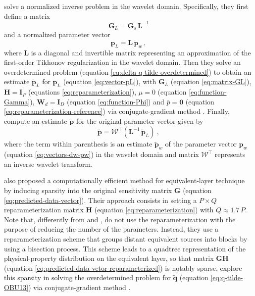 \citet{li-oldenburg2010} solve a normalized inverse problem in the wavelet domain.
Specifically, they first define a matrix
\begin{equation}
	\mathbf{G}_{L} = \mathbf{G}_{s} \, \mathbf{L}^{-1}
	\label{eq:matrix-GL}
\end{equation}
and a normalized parameter vector 
\begin{equation}
	\mathbf{p}_{L} = \mathbf{L} \, \mathbf{p}_{w} \: ,
	\label{eq:vector-pL}
\end{equation}
where $\mathbf{L}$ is a diagonal and invertible matrix representing an approximation of the 
first-order Tikhonov regularization in the wavelet domain.
Then they solve an overdetermined problem (equation \ref{eq:delta-q-tilde-overdetermined}) 
to obtain an estimate $\tilde{\mathbf{p}}_{L}$ for $\mathbf{p}_{L}$ (equation \ref{eq:vector-pL}), 
with $\mathbf{G}_{L}$ (equation \ref{eq:matrix-GL}), 
$\mathbf{H} = \mathbf{I}_{P}$ (equations \ref{eq:reparameterization}),
$\mu = 0$ (equation \ref{eq:function-Gamma}), 
$\mathbf{W}_{d} = \mathbf{I}_{D}$ (equation \ref{eq:function-Phi}) and 
$\bar{p} = \mathbf{0}$ (equation \ref{eq:reparameterization-reference}) via 
conjugate-gradient method \cite[e.g.,][sec. 11.3]{golub-vanloan2013}.
Finally, \citet{li-oldenburg2010} compute an estimate $\tilde{\mathbf{p}}$ for the original parameter vector given by
\begin{equation}
	\tilde{\mathbf{p}} = \boldsymbol{\mathcal{W}}^{\top} \left( \mathbf{L}^{-1} \, \tilde{\mathbf{p}}_{L} \right) \: ,
	\label{eq:vector-p-tilde-LO10}
\end{equation}
where the term within parenthesis is an estimate $\tilde{\mathbf{p}}_{w}$ of the parameter vector $\mathbf{p}_{w}$
(equation \ref{eq:vectors-dw-pw}) in the wavelet domain and 
matrix $\boldsymbol{\mathcal{W}}^{\top}$ represents an inverse wavelet transform. 

\citet{barnes-lumley2011} also proposed a computationally efficient method for equivalent-layer technique 
by inducing sparsity into the original sensitivity matrix $\mathbf{G}$ (equation \ref{eq:predicted-data-vector}). 
Their approach consists in setting a $P \times Q$ reparameterization matrix $\mathbf{H}$
(equation \ref{eq:reparameterization}) with $Q \approx 1.7 \, P$.
Note that, differently from \citet{oliveirajr-etal2013} and \citet{mendonca-2020}, \citet{barnes-lumley2011}
do not use the reparameterization with the purpose of reducing the number of the parameters.
Instead, they use a reparameterization scheme that groups distant equivalent sources into blocks by
using a bisection process. 
This scheme leads to a quadtree representation of the physical-property distribution on the equivalent layer, 
so that matrix $\mathbf{G}\mathbf{H}$ (equation \ref{eq:predicted-data-vetor-reparameterized}) is notably sparse.
\cite{barnes-lumley2011} explore this sparsity in solving the overdetermined problem for $\tilde{\mathbf{q}}$
(equation \ref{eq:q-tilde-OBU13}) via conjugate-gradient method \cite[e.g.,][sec. 11.3]{golub-vanloan2013}.

